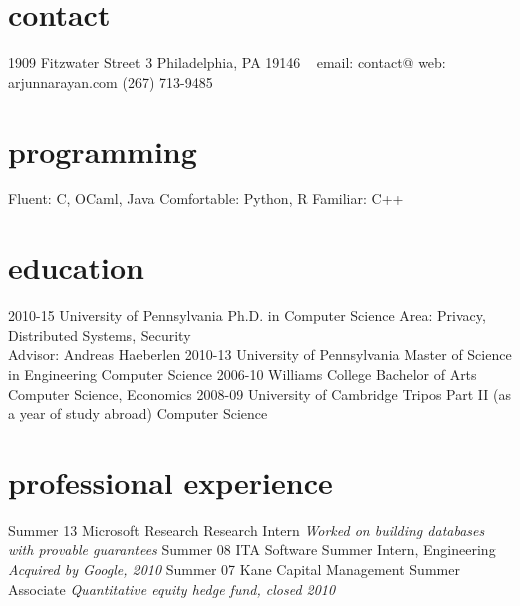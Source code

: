 \documentclass[print]{friggeri-cv}
\begin{document}
       {}

\begin{aside}
  \section{contact}
    1909 Fitzwater Street 3
    Philadelphia, PA 19146
    ~
    email: contact@
    web: arjunnarayan.com
    (267) 713-9485
  \section{programming}
    Fluent: C, OCaml, Java
    Comfortable: Python, R
    Familiar: C++
\end{aside}
\section{education}
\begin{entrylist}
  \entry
    {2010-15}
    {University of Pennsylvania}
    {Ph.D. {\normalfont in Computer Science}}
    {Area: Privacy, Distributed Systems, Security\\
    Advisor: Andreas Haeberlen}%
  \entry
    {2010-13}
    {University of Pennsylvania}
    {Master of Science in Engineering}
    {Computer Science}
  \entry
    {2006-10}
    {Williams College}
    {Bachelor of Arts}
    {Computer Science, Economics}%
  \entry
    {2008-09}
    {University of Cambridge}
    {Tripos Part II {\normalfont (as a year of study abroad)}}
    {Computer Science}%
\end{entrylist}
\section{professional experience}
\begin{entrylist}
  \entry
    {Summer 13}
    {Microsoft Research}
    {Research Intern}
    {\emph{Worked on building databases with provable guarantees}}
  \entry
    {Summer 08}
    {ITA Software}
    {Summer Intern, Engineering}
    {\emph{Acquired by Google, 2010}}
  \entry
    {Summer 07}
    {Kane Capital Management}
    {Summer Associate}
    {\emph{Quantitative equity hedge fund, closed 2010}}
\end{entrylist}
\end{document}
